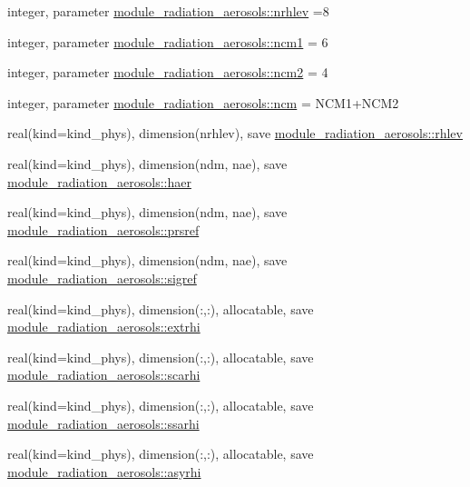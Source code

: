 \begin{DoxyCompactItemize}
integer, parameter \hyperlink{namespacemodule__radiation__aerosols_aa6d18b0588e80cb40871cc75870d09ba}{module\+\_\+radiation\+\_\+aerosols\+::nrhlev} =8
\item 
integer, parameter \hyperlink{namespacemodule__radiation__aerosols_ac6bc533a79d4b19129834cbc9a9fbc18}{module\+\_\+radiation\+\_\+aerosols\+::ncm1} = 6
\item 
integer, parameter \hyperlink{namespacemodule__radiation__aerosols_a61dbcce5b0bb02dd31d4a37983887a7b}{module\+\_\+radiation\+\_\+aerosols\+::ncm2} = 4
\item 
integer, parameter \hyperlink{namespacemodule__radiation__aerosols_ab46e61a4a386794a5e9e97d8ef7d98a5}{module\+\_\+radiation\+\_\+aerosols\+::ncm} = N\+C\+M1+N\+C\+M2
\item 
real(kind=kind\+\_\+phys), dimension(nrhlev), save \hyperlink{namespacemodule__radiation__aerosols_a6aa3218393ea05cab77ab7867cfeab90}{module\+\_\+radiation\+\_\+aerosols\+::rhlev}
\item 
real(kind=kind\+\_\+phys), dimension(ndm, nae), save \hyperlink{namespacemodule__radiation__aerosols_a8ce24a58afb33dd372995bf5aaf95be9}{module\+\_\+radiation\+\_\+aerosols\+::haer}
\item 
real(kind=kind\+\_\+phys), dimension(ndm, nae), save \hyperlink{namespacemodule__radiation__aerosols_a274fad1b6e00e66375882e32494d61c0}{module\+\_\+radiation\+\_\+aerosols\+::prsref}
\item 
real(kind=kind\+\_\+phys), dimension(ndm, nae), save \hyperlink{namespacemodule__radiation__aerosols_a227ac7558dc0f33c34c34544771617ec}{module\+\_\+radiation\+\_\+aerosols\+::sigref}
\item 
real(kind=kind\+\_\+phys), dimension(\+:,\+:), allocatable, save \hyperlink{namespacemodule__radiation__aerosols_a40447f925f01790155c4d98ff8b0c04d}{module\+\_\+radiation\+\_\+aerosols\+::extrhi}
\item 
real(kind=kind\+\_\+phys), dimension(\+:,\+:), allocatable, save \hyperlink{namespacemodule__radiation__aerosols_a439929b1de549fadecc8537bae13e9de}{module\+\_\+radiation\+\_\+aerosols\+::scarhi}
\item 
real(kind=kind\+\_\+phys), dimension(\+:,\+:), allocatable, save \hyperlink{namespacemodule__radiation__aerosols_ae4e1ead8bb34371c2d9f1b428846c10c}{module\+\_\+radiation\+\_\+aerosols\+::ssarhi}
\item 
real(kind=kind\+\_\+phys), dimension(\+:,\+:), allocatable, save \hyperlink{namespacemodule__radiation__aerosols_aac2d735c117dd7d1e72264e611764f79}{module\+\_\+radiation\+\_\+aerosols\+::asyrhi}

\end{DoxyCompactItemize}
